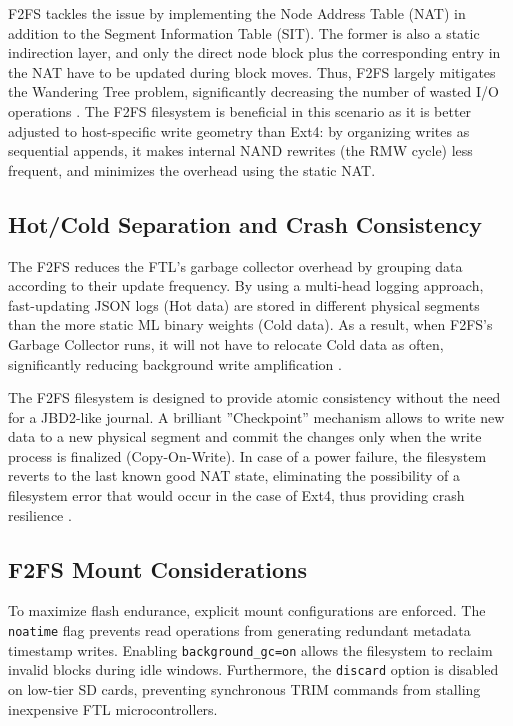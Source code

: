 \documentclass[conference]{IEEEtran}
\begin{document}
F2FS tackles the issue by implementing the Node Address Table (NAT) in addition to the Segment Information Table (SIT). The former is also a static indirection layer, and only the direct node block plus the corresponding entry in the NAT have to be updated during block moves. Thus, F2FS largely mitigates the Wandering Tree problem, significantly decreasing the number of wasted I/O operations \cite{b22}. The F2FS filesystem is beneficial in this scenario as it is better adjusted to host-specific write geometry than Ext4: by organizing writes as sequential appends, it makes internal NAND rewrites (the RMW cycle) less frequent, and minimizes the overhead using the static NAT.

\subsection{Hot/Cold Separation and Crash Consistency}
The F2FS reduces the FTL’s garbage collector overhead by grouping data according to their update frequency. By using a multi-head logging approach, fast-updating JSON logs (Hot data) are stored in different physical segments than the more static ML binary weights (Cold data). As a result, when F2FS’s Garbage Collector runs, it will not have to relocate Cold data as often, significantly reducing background write amplification \cite{b27}.

The F2FS filesystem is designed to provide atomic consistency without the need for a JBD2-like journal. A brilliant ”Checkpoint” mechanism allows to write new data to a new physical segment and commit the changes only when the write process is finalized (Copy-On-Write). In case of a power failure, the filesystem reverts to the last known good NAT state, eliminating the possibility of a filesystem error that would occur in the case of Ext4, thus providing crash resilience \cite{b29}.

\subsection{F2FS Mount Considerations}
To maximize flash endurance, explicit mount configurations are enforced. The \texttt{noatime} flag prevents read operations from generating redundant metadata timestamp writes. Enabling \texttt{background\_gc=on} allows the filesystem to reclaim invalid blocks during idle windows. Furthermore, the \texttt{discard} option is disabled on low-tier SD cards, preventing synchronous TRIM commands from stalling inexpensive FTL microcontrollers.
\end{document}
